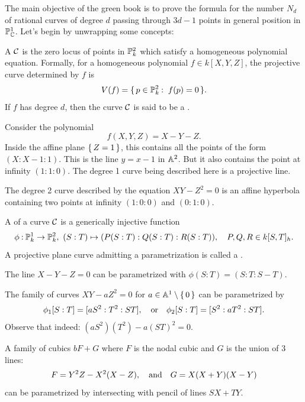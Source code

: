 \documentclass[12pt]{memoir}
\begin{document}
The main objective of the green book is to prove the formula for the number $N_d$ of rational curves of degree $d$ passing through $3d-1$ points in general position in $\mathbb{P}_{\mathbb{C}}^1$. Let's begin by unwrapping some concepts:

\begin{Def}
A  $\mathcal{C}$ is the zero locus of points in $\mathbb{P}^2_k$ which satisfy a homogeneous polynomial equation. Formally, for a homogeneous polynomial $f\in k[X,Y,Z]$, the projective curve determined by $f$ is
$$V(f)=\set{p\in\bP^2_k\:\ f(p)=0}.$$
If $f$ has degree $d$, then the curve $\mathcal{C}$ is said to be a .
\end{Def}

\begin{Ex}
Consider the polynomial 
$$f(X,Y,Z)=X-Y-Z.$$
Inside the affine plane $\{\,Z=1\,\}$, this contains all the points of the form $(X:X-1:1)$. This is the line $y=x-1$ in $\mathbb{A}^2$. But it also contains the point at infinity $(1:1:0)$. The degree 1 curve being described here is a projective line.
\end{Ex}

\begin{Ex}
    The degree 2 curve described by the equation $XY-Z^2=0$ is an affine hyperbola containing two points at infinity $(1:0:0)$ and $(0:1:0)$. 
\end{Ex}

\begin{Def}
A  of a curve $\mathcal{C}$ is a generically injective function $$\phi\:\bP^1_k\to\bP^2_k,\ (S:T)\mapsto(P(S:T):Q(S:T):R(S:T)),\quad P,Q,R\in k[S,T]_h.$$
A projective plane curve admitting a parametrization is called a .
\end{Def}

\begin{Ex}
    The line $X-Y-Z=0$ can be parametrized with $\phi(S:T)=(S:T:S-T)$. 
\end{Ex}

\begin{Ex}
    The family of curves $XY-aZ^2=0$ for $a\in\mathbb{A}^1\setminus\{\,0\,\}$ can be parametrized by 
    $$\phi_1[S:T]=[aS^2:T^2:ST],\quad\text{or}\quad\phi_2[S:T]=[S^2:aT^2:ST].$$
    Observe that indeed: $(aS^2)(T^2)-a(ST)^2=0$. 
\end{Ex}

\begin{Ex}
    A family of cubics $bF+G$ where $F$ is the nodal cubic and $G$ is the union of $3$ lines:
    $$F=Y^2Z-X^2(X-Z),\quad\text{and}\quad G=X(X+Y)(X-Y)$$
    can be parametrized by intersecting with pencil of lines $SX+TY$. 
\end{Ex}
\end{document}
